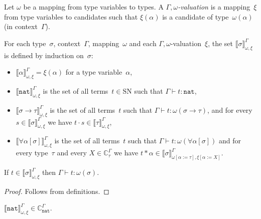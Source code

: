 \documentclass[runningheads,a4paper]{llncs}
\newcommand{\app}[2]{#1 \cdot #2}
\newcommand{\tapp}[2]{#1 * #2}
\newcommand{\subst}[2]{#1:=#2}
\newcommand{\nat}{\mathtt{nat}}
\newcommand{\SN}{\mathrm{SN}}
\newcommand{\Cb}{\mathbb{C}}
\newcommand{\val}[3]{\ensuremath{\llbracket#1\rrbracket_{#2}^{#3}}}
\newcommand{\proves}{\vdash}
\begin{document}
\begin{definition}\label{def_reducibility_valuation}
  Let $\omega$ be a mapping from type variables to types. A
  \emph{$\Gamma,\omega$-valuation} is a mapping~$\xi$ from type
  variables to candidates such that $\xi(\alpha)$ is a candidate of
  type~$\omega(\alpha)$ (in context~$\Gamma$).

  For each type~$\sigma$, context~$\Gamma$, mapping~$\omega$
  and each $\Gamma,\omega$-valuation~$\xi$, the set $\val{\sigma}{\omega,\xi}{\Gamma}$ is
  defined by induction on~$\sigma$:
  \begin{itemize}
  \item $\val{\alpha}{\omega,\xi}{\Gamma} = \xi(\alpha)$ for a type
    variable~$\alpha$,
  \item $\val{\nat}{\omega,\xi}{\Gamma}$ is the set of all
    terms~$t \in \SN$ such that $\Gamma \proves t : \nat$,
  \item $\val{\sigma \to \tau}{\omega,\xi}{\Gamma}$ is the set of all
    terms~$t$ such that $\Gamma \proves t : \omega(\sigma \to \tau)$,
    and for every~$s \in \val{\sigma}{\omega,\xi}{\Gamma}$ we have
    $\app{t}{s} \in \val{\tau}{\omega,\xi}{\Gamma}$,
  \item $\val{\forall\alpha[\sigma]}{\omega,\xi}{\Gamma}$ is the set
    of all terms~$t$ such that
    $\Gamma \proves t : \omega(\forall\alpha[\sigma])$ and for every
    type~$\tau$ and every $X \in \Cb_\tau^\Gamma$ we have
    $\tapp{t}{\alpha} \in
    \val{\sigma}{\omega[\subst{\alpha}{\tau}],\xi[\subst{\alpha}{X}]}{\Gamma}$.
  \end{itemize}
\end{definition}

\begin{lemma}\label{lem_val_typable}
  If $t \in \val{\sigma}{\omega,\xi}{\Gamma}$ then
  $\Gamma \proves t : \omega(\sigma)$.
\end{lemma}

\begin{proof}
  Follows from definitions.
\end{proof}

\begin{lemma}\label{lem_nat_reducible}
  $\val{\nat}{\omega,\xi}{\Gamma} \in \Cb_{\nat}^\Gamma$.
\end{lemma}
\end{document}
